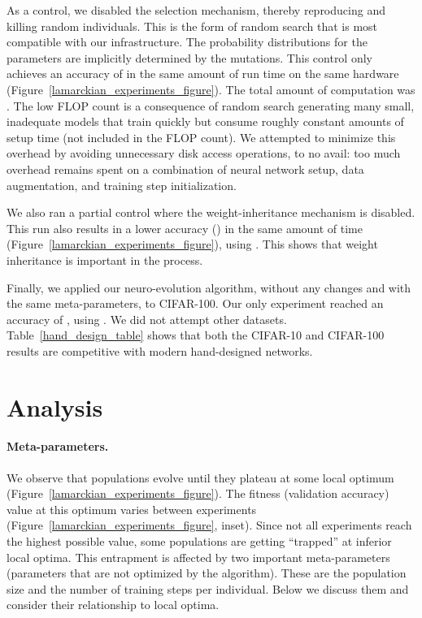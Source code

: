 \documentclass{article}
\newcommand{\controlacc}{87.3}
\newcommand{\controlflopsbase}{2}
\newcommand{\controlflopsexp}{17}
\newcommand{\darwinacc}{92.2}
\newcommand{\darwinflopsbase}{9}
\newcommand{\darwinflopsexp}{19}
\newcommand{\onehundredacc}{77.0}
\newcommand{\onehundredflopsbase}{2}
\newcommand{\onehundredflopsexp}{20}
\begin{document}
As a control, we disabled the selection mechanism, thereby reproducing and killing random individuals. This is the form of random search that is most compatible with our infrastructure. The probability distributions for the parameters are implicitly determined by the mutations. This control only achieves an accuracy of \acc{\controlacc} in the same amount of run time on the same hardware (Figure~\ref{lamarckian_experiments_figure}). The total amount of computation was \flops{\controlflopsbase}{\controlflopsexp}. The low FLOP count is a consequence of random search generating many small, inadequate models that train quickly but consume roughly constant amounts of setup time (not included in the FLOP count). We attempted to minimize this overhead by avoiding unnecessary disk access operations, to no avail: too much overhead remains spent on a combination of neural network setup, data augmentation, and training step initialization.

We also ran a partial control where the weight-inheritance mechanism is disabled. This run also results in a lower accuracy (\acc{\darwinacc}) in the same amount of time (Figure~\ref{lamarckian_experiments_figure}), using \flops{\darwinflopsbase}{\darwinflopsexp}. This shows that weight inheritance is important in the process.

Finally, we applied our neuro-evolution algorithm, without any changes and with the same meta-parameters, to CIFAR-100. Our only experiment reached an accuracy of \acc{\onehundredacc}, using \flops{\onehundredflopsbase}{\onehundredflopsexp}. We did not attempt other datasets. Table~\ref{hand_design_table} shows that both the CIFAR-10 and CIFAR-100 results are competitive with modern hand-designed networks.


\section{Analysis}
\label{analysis_section}

\paragraph{Meta-parameters.} We observe that populations evolve until they plateau at some local optimum (Figure~\ref{lamarckian_experiments_figure}). The fitness (\ie validation accuracy) value at this optimum varies between experiments (Figure~\ref{lamarckian_experiments_figure}, inset). Since not all experiments reach the highest possible value, some populations are getting ``trapped'' at inferior local optima. This entrapment is affected by two important meta-parameters (\ie parameters that are not optimized by the algorithm). These are the population size and the number of training steps per individual. Below we discuss them and consider their relationship to local optima.
\end{document}
